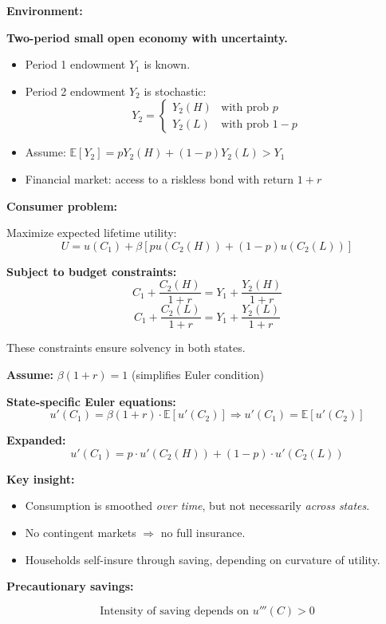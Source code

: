 \documentclass[12pt]{article}
\begin{document}
{\color{blue}
\textbf{Environment:}

\textbf{Two-period small open economy with uncertainty.}

\begin{itemize}
\item Period 1 endowment $Y_1$ is known.
\item Period 2 endowment $Y_2$ is stochastic:
\[
Y_2 = 
\begin{cases}
Y_2(H) & \text{with prob } p \\
Y_2(L) & \text{with prob } 1 - p
\end{cases}
\]
\item Assume: \( \mathbb{E}[Y_2] = pY_2(H) + (1 - p)Y_2(L) > Y_1 \)
\item Financial market: access to a riskless bond with return \( 1 + r \)
\end{itemize}

\textbf{Consumer problem:}

Maximize expected lifetime utility:
\[
U = u(C_1) + \beta \left[ p u(C_2(H)) + (1 - p) u(C_2(L)) \right]
\]

\textbf{Subject to budget constraints:}
\[
C_1 + \frac{C_2(H)}{1 + r} = Y_1 + \frac{Y_2(H)}{1 + r} \tag{BC-H}
\]
\[
C_1 + \frac{C_2(L)}{1 + r} = Y_1 + \frac{Y_2(L)}{1 + r} \tag{BC-L}
\]

These constraints ensure solvency in both states.

\textbf{Assume:} \( \beta (1 + r) = 1 \) (simplifies Euler condition)

\textbf{State-specific Euler equations:}
\[
u'(C_1) = \beta (1 + r) \cdot \mathbb{E}[u'(C_2)]
\Rightarrow u'(C_1) = \mathbb{E}[u'(C_2)] \tag{SE}
\]

\textbf{Expanded:}
\[
u'(C_1) = p \cdot u'(C_2(H)) + (1 - p) \cdot u'(C_2(L)) \tag{29}
\]

\textbf{Key insight:}

\begin{itemize}
\item Consumption is smoothed \textit{over time}, but not necessarily \textit{across states}.
\item No contingent markets $\Rightarrow$ no full insurance.
\item Households self-insure through saving, depending on curvature of utility.
\end{itemize}

\textbf{Precautionary savings:}

\[
\text{Intensity of saving depends on } u'''(C) > 0
\]

}
\end{document}
